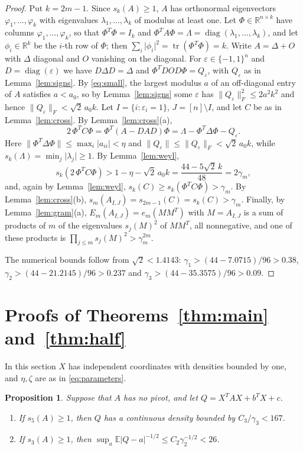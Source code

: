 \documentclass[11pt]{amsart}
\numberwithin{equation}{section}
\newtheorem{proposition}[theorem]{Proposition}
\theoremstyle{definition}
\theoremstyle{remark}
\newcommand{\R}{\mathbb R}
\newcommand{\E}{\mathbb E}
\newcommand{\1}{\mathbf 1}
\DeclareMathOperator{\diag}{diag}
\DeclareMathOperator{\tr}{tr}
\newcommand{\norm}[1]{\lVert #1\rVert}
\newcommand{\abs}[1]{\lvert #1\rvert}
\begin{document}
\begin{proof}
Put $k=2m-1$. Since $s_k(A)\ge1$, $A$ has orthonormal eigenvectors $\varphi_1,\dots,\varphi_k$ with eigenvalues $\lambda_1,\dots,\lambda_k$ of modulus at least one. Let $\Phi\in\R^{n\times k}$ have columns $\varphi_1,\dots,\varphi_k$, so that $\Phi^T\Phi=I_k$ and $\Phi^TA\Phi=\Lambda=\diag(\lambda_1,\dots,\lambda_k)$, and let $\phi_i\in\R^k$ be the $i$-th row of $\Phi$; then $\sum_i\abs{\phi_i}^2=\tr(\Phi^T\Phi)=k$. Write $A=\Delta+O$ with $\Delta$ diagonal and $O$ vanishing on the diagonal. For $\varepsilon\in\{-1,1\}^n$ and $D=\diag(\varepsilon)$ we have $D\Delta D=\Delta$ and $\Phi^TDOD\Phi=Q_\varepsilon$, with $Q_\varepsilon$ as in Lemma~\ref{lem:signs}. By \eqref{eq:small}, the largest modulus $a$ of an off-diagonal entry of $A$ satisfies $a<a_0$, so by Lemma~\ref{lem:signs} some $\varepsilon$ has $\norm{Q_\varepsilon}_F^2\le2a^2k^2$ and hence $\norm{Q_\varepsilon}_F<\sqrt2\,a_0k$. Let $I=\{i:\varepsilon_i=1\}$, $J=[n]\setminus I$, and let $C$ be as in Lemma~\ref{lem:cross}. By Lemma~\ref{lem:cross}(a),
\[
2\,\Phi^TC\Phi=\Phi^T(A-DAD)\Phi=\Lambda-\Phi^T\Delta\Phi-Q_\varepsilon .
\]
Here $\norm{\Phi^T\Delta\Phi}\le\max_i\abs{a_{ii}}<\eta$ and $\norm{Q_\varepsilon}\le\norm{Q_\varepsilon}_F<\sqrt2\,a_0k$, while $s_k(\Lambda)=\min_j\abs{\lambda_j}\ge1$. By Lemma~\ref{lem:weyl},
\[
s_k(2\,\Phi^TC\Phi)>1-\eta-\sqrt2\,a_0k=\frac{44-5\sqrt2\,k}{48}=2\gamma_m ,
\]
and, again by Lemma~\ref{lem:weyl}, $s_k(C)\ge s_k(\Phi^TC\Phi)>\gamma_m$. By Lemma~\ref{lem:cross}(b), $s_m(A_{I,J})=s_{2m-1}(C)=s_k(C)>\gamma_m$. Finally, by Lemma~\ref{lem:gram}(a), $E_m(A_{I,J})=e_m(MM^T)$ with $M=A_{I,J}$ is a sum of products of $m$ of the eigenvalues $s_j(M)^2$ of $MM^T$, all nonnegative, and one of these products is $\prod_{j\le m}s_j(M)^2>\gamma_m^{2m}$.

The numerical bounds follow from $\sqrt2<1.4143$: $\gamma_1>(44-7.0715)/96>0.38$, $\gamma_2>(44-21.2145)/96>0.237$ and $\gamma_3>(44-35.3575)/96>0.09$.
\end{proof}

\section{Proofs of Theorems~\ref{thm:main} and~\ref{thm:half}}\label{sec:proof}

In this section $X$ has independent coordinates with densities bounded by one, and $\eta,\zeta$ are as in \eqref{eq:parameters}.

\begin{proposition}\label{prop:nopivot}
Suppose that $A$ has no pivot, and let $Q=X^TAX+b^TX+c$.
\begin{enumerate}
\item[(a)] If $s_5(A)\ge1$, then $Q$ has a continuous density bounded by $C_3/\gamma_3<167$.
\item[(b)] If $s_3(A)\ge1$, then $\sup_a\E\abs{Q-a}^{-1/2}\le C_2\gamma_2^{-1/2}<26$.
\end{enumerate}
\end{proposition}
\end{document}
